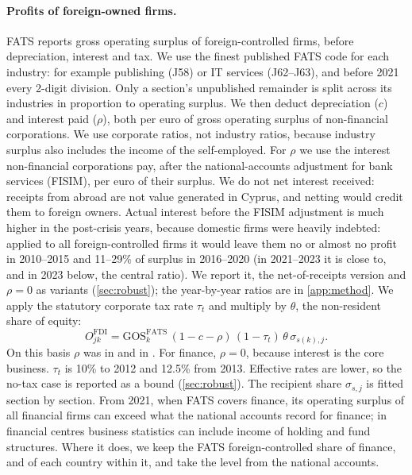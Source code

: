 \documentclass[11pt]{article}
\begin{document}
\paragraph{Profits of foreign-owned firms.}
FATS reports gross operating surplus of foreign-controlled firms, before depreciation, interest and tax.
We use the finest published FATS code for each industry: for example publishing (J58) or IT services (J62--J63), and before 2021 every 2-digit division.
Only a section's unpublished remainder is split across its industries in proportion to operating surplus.
We then deduct depreciation ($c$) and interest paid ($\rho$), both per euro of gross operating surplus of non-financial corporations.
We use corporate ratios, not industry ratios, because industry surplus also includes the income of the self-employed.
For $\rho$ we use the interest non-financial corporations pay, after the national-accounts adjustment for bank services (FISIM), per euro of their surplus.
We do not net interest received: receipts from abroad are not value generated in Cyprus, and netting would credit them to foreign owners.
Actual interest before the FISIM adjustment is much higher in the post-crisis years, because domestic firms were heavily indebted: applied to all foreign-controlled firms it would leave them no or almost no profit in 2010--2015 and 11--29\% of surplus in 2016--2020 (in 2021--2023 it is close to, and in 2023 below, the central ratio).
We report it, the net-of-receipts version and $\rho=0$ as variants (\cref{sec:robust}); the year-by-year ratios are in \cref{app:method}.
We apply the statutory corporate tax rate $\tau_t$ and multiply by $\theta$, the non-resident share of equity:
\begin{equation}
O^{\text{FDI}}_{jk} = \text{GOS}^{\text{FATS}}_{k}\,(1-c-\rho)\,(1-\tau_t)\,\theta\,\sigma_{s(k),j}.
\label{eq:fdi}
\end{equation}
On this basis $\rho$ was \InterestRatioFirst{} in \FirstYear{} and \InterestRatioLast{} in \LastYear{}.
For finance, $\rho=0$, because interest is the core business.
$\tau_t$ is 10\% to 2012 and 12.5\% from 2013.
Effective rates are lower, so the no-tax case is reported as a bound (\cref{sec:robust}).
The recipient share $\sigma_{s,j}$ is fitted section by section.
From 2021, when FATS covers finance, its operating surplus of all financial firms can exceed what the national accounts record for finance; in financial centres business statistics can include income of holding and fund structures.
Where it does, we keep the FATS foreign-controlled share of finance, and of each country within it, and take the level from the national accounts.
\end{document}

